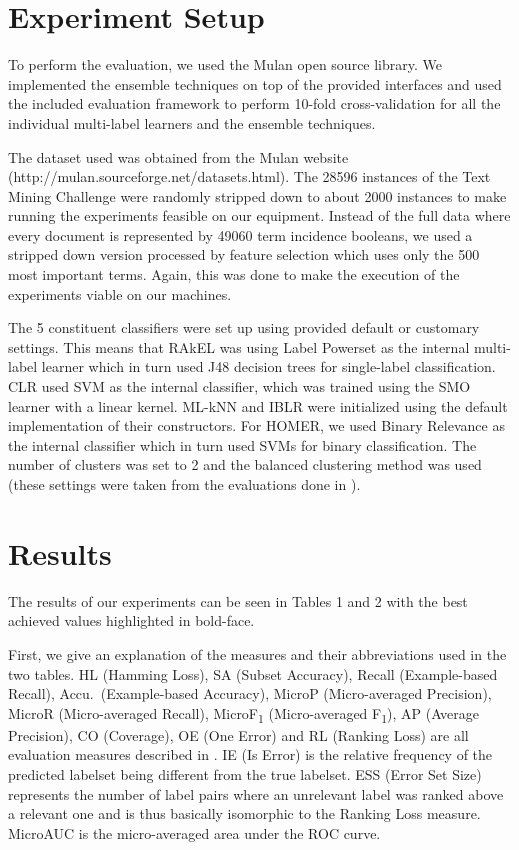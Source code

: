 \section{Experiment Setup}
To perform the evaluation, we used the Mulan \cite{mulan} open source
library. We implemented the ensemble techniques on top of the provided
interfaces and used the included evaluation framework to perform
10-fold cross-validation for all the individual multi-label learners
and the ensemble techniques.

The dataset used was obtained from the Mulan website
(http://mulan.sourceforge.net/datasets.html). The 28596 instances of
the Text Mining Challenge were randomly stripped down to about 2000
instances to make running the experiments feasible on our
equipment. Instead of the full data where every document is
represented by 49060 term incidence booleans, we used a stripped down
version processed by feature selection which uses only the 500 most
important terms. Again, this was done to make the execution of the
experiments viable on our machines.

The 5 constituent classifiers were set up using provided default or
customary settings. This means that RAkEL was using Label Powerset as
the internal multi-label learner which in turn used J48 decision trees
for single-label classification. CLR used SVM as the internal
classifier, which was trained using the SMO learner with a linear
kernel. ML-kNN and IBLR were initialized using the default
implementation of their constructors. For HOMER, we used Binary
Relevance as the internal classifier which in turn used SVMs for
binary classification. The number of clusters was set to 2 and the
balanced clustering method was used (these settings were taken from
the evaluations done in \cite{HOMER}).

\section{Results}




The results of our experiments can be seen in Tables 1 and 2 with the
best achieved values highlighted in bold-face.

First, we give an explanation of the measures and their abbreviations
used in the two tables. HL (Hamming Loss), SA (Subset Accuracy),
Recall (Example-based Recall), Accu.\ (Example-based Accuracy), MicroP
(Micro-averaged Precision), MicroR (Micro-averaged Recall),
MicroF\textsubscript{1} (Micro-averaged F\textsubscript{1}), AP
(Average Precision), CO (Coverage), OE (One Error) and RL (Ranking
Loss) are all evaluation measures described in \cite{MLLSlides}. IE
(Is Error) is the relative frequency of the predicted labelset being
different from the true labelset. ESS (Error Set Size) represents the
number of label pairs where an unrelevant label was ranked above a
relevant one and is thus basically isomorphic to the Ranking Loss
measure. MicroAUC is the micro-averaged area under the ROC curve.

